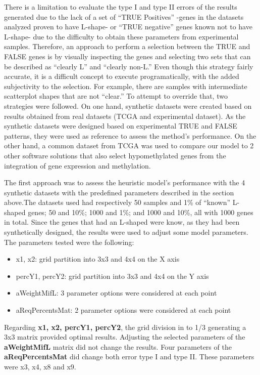 \documentclass[10pt,letterpaper]{article}
\providecommand{\tightlist}{%
  \setlength{\itemsep}{0pt}\setlength{\parskip}{0pt}}
\begin{document}
There is a limitation to evaluate the type I and type II errors of the
results generated due to the lack of a set of ``TRUE Positives'' -genes
in the datasets analyzed proven to have L-shape- or ``TRUE negative''
genes known not to have L-shape- due to the difficulty to obtain these
parameters from experimental samples. Therefore, an approach to perform
a selection between the TRUE and FALSE genes is by visually inspecting
the genes and selecting two sets that can be described as ``clearly L''
and ``clearly non-L.'' Even though this strategy fairly accurate, it is
a difficult concept to execute programatically, with the added
subjectivity to the selection. For example, there are samples with
intermediate scatterplot shapes that are not ``clear.'' To attempt to
override that, two strategies were followed. On one hand, synthetic
datasets were created based on results obtained from real datasets (TCGA
and experimental dataset). As the synthetic datasets were designed based
on experimental TRUE and FALSE patterns, they were used as reference to
assess the method's performance. On the other hand, a common dataset
from TCGA was used to compare our model to 2 other software solutions
that also select hypomethylated genes from the integration of gene
expression and methylation.

The first approach was to assess the heuristic model's performance with
the 4 synthetic datasets with the predefined parameters described in the
section above.The datasets used had respectively 50 samples and 1\% of
``known'' L-shaped genes; 50 and 10\%; 1000 and 1\%; and 1000 and 10\%,
all with 1000 genes in total. Since the genes that had an L-shaped were
know, as they had been synthetically designed, the results were used to
adjust some model parameters. The parameters tested were the following:

\begin{itemize}
\tightlist
\item
  x1, x2: grid partition into 3x3 and 4x4 on the X axis
\item
  percY1, percY2: grid partition into 3x3 and 4x4 on the Y axis
\item
  aWeightMifL: 3 parameter options were considered at each point
\item
  aReqPercentsMat: 2 parameter options were considered at each point
\end{itemize}

Regarding \textbf{x1, x2, percY1, percY2}, the grid division in to 1/3
generating a 3x3 matrix provided optimal results. Adjusting the selected
parameters of the \textbf{aWeightMifL} matrix did not change the
results. Four parameters of the \textbf{aReqPercentsMat} did change both
error type I and type II. These parameters were x3, x4, x8 and x9.
\end{document}
